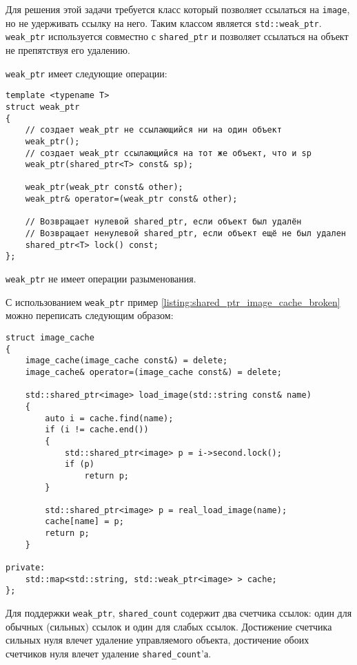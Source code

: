 Для решения этой задачи требуется класс который позволяет ссылаться на \texttt{image}, но не удерживать ссылку на него. Таким классом является \texttt{std::weak_ptr}. \texttt{weak_ptr} используется совместно с \texttt{shared_ptr} и позволяет ссылаться на объект не препятствуя его удалению.

\texttt{weak_ptr} имеет следующие операции:

\begin{verbatim}
template <typename T>
struct weak_ptr
{
    // создает weak_ptr не ссылающийся ни на один объект
    weak_ptr();
    // создает weak_ptr ссылающийся на тот же объект, что и sp
    weak_ptr(shared_ptr<T> const& sp);

    weak_ptr(weak_ptr const& other);
    weak_ptr& operator=(weak_ptr const& other);

    // Возвращает нулевой shared_ptr, если объект был удалён
    // Возвращает ненулевой shared_ptr, если объект ещё не был удален
    shared_ptr<T> lock() const;
};
\end{verbatim}

\texttt{weak_ptr} не имеет операции разыменования.

С использованием \texttt{weak_ptr} пример \ref{listing:shared_ptr_image_cache_broken} можно переписать следующим образом:

\begin{verbatim}
struct image_cache
{
    image_cache(image_cache const&) = delete;
    image_cache& operator=(image_cache const&) = delete;

    std::shared_ptr<image> load_image(std::string const& name)
    {
        auto i = cache.find(name);
        if (i != cache.end())
        {
            std::shared_ptr<image> p = i->second.lock();
            if (p)
                return p;
        }

        std::shared_ptr<image> p = real_load_image(name);
        cache[name] = p;
        return p;
    }

private:
    std::map<std::string, std::weak_ptr<image> > cache;
};
\end{verbatim}

Для поддержки \texttt{weak_ptr}, \texttt{shared_count} содержит два счетчика ссылок: один для обычных (сильных) ссылок и один для слабых ссылок. Достижение счетчика сильных нуля влечет удаление управляемого объекта, достичение обоих счетчиков нуля влечет удаление \texttt{shared_count}'а.


